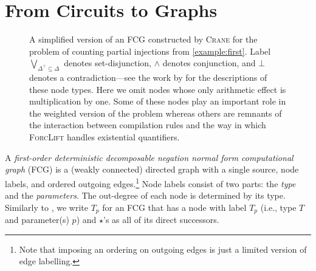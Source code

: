 \documentclass[letterpaper]{article} %
\DeclareMathOperator{\CR}{\textsc{CR}}
\DeclareMathOperator{\GDR}{\textsc{GDR}}
\DeclareMathOperator{\Reff}{\textsc{Ref}}
\theoremstyle{definition}
\begin{document}
\section{From Circuits to Graphs}\label{sec:methods}

\begin{figure}[t]
  \centering
  \caption{A simplified version of an FCG constructed by \textsc{Crane} for the
    problem of counting partial injections from \cref{example:first}. Label
    $\bigvee_{\Delta^\top \subseteq \Delta}$ denotes set-disjunction, $\land$
    denotes conjunction, and $\bot$ denotes a contradiction---see the work by
    \citet{DBLP:conf/ijcai/BroeckTMDR11} for the descriptions of these node
    types. Here we omit nodes whose only arithmetic effect is multiplication by
    one. Some of these nodes play an important role in the weighted version of
    the problem whereas others are remnants of the interaction between
    compilation rules and the way in which \textsc{ForcLift} handles existential
    quantifiers.}\label{fig:examplefcg}
\end{figure}

A \emph{first-order deterministic decomposable negation normal form
  computational graph} (FCG) is a (weakly connected) directed graph with a
single source, node labels, and ordered outgoing edges.\footnote{Note that
  imposing an ordering on outgoing edges is just a limited version of edge
  labelling.} Node labels consist of two parts: the \emph{type} and the
\emph{parameters}. The out-degree of each node is determined by its type.
Similarly to \citet{DBLP:conf/ijcai/BroeckTMDR11}, we write $T_p$ for an FCG
that has a node with label $T_p$ (i.e., type $T$ and parameter(s) $p$) and
$\star$'s as all of its direct successors.
\end{document}

